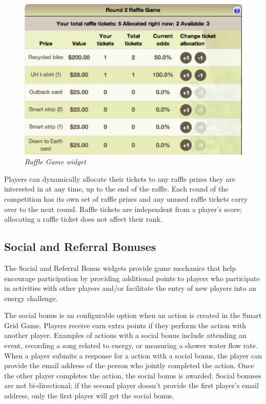 \begin{figure}[th]
  \center
  \includegraphics[width=0.95\columnwidth]{raffle-small.eps}
  \caption{\em \small Raffle Game widget}
  \label{fig:RaffleGame}
\end{figure}

Players can dynamically allocate their tickets to any raffle prizes they are interested in at any time, up to the end of the raffle. Each round of the competition has its own set of raffle prizes and any unused raffle tickets carry over to the next round. Raffle tickets are independent from a player's score; allocating a raffle ticket does not affect their rank. 

\subsection{Social and Referral Bonuses}

The Social and Referral Bonus widgets provide game mechanics that help encourage participation by providing additional points to players who participate in activities with other players and/or facilitate the entry of new players into an energy challenge.

The social bonus is an configurable option when an action is created in the Smart Grid Game. Players receive earn extra points if they perform the action with another player. Examples of actions with a social bonus include attending an event, recording a song related to energy, or measuring a shower water flow rate. When a player submits a response for a action with a social bonus, the player can provide the email address of the person who jointly completed the action. Once the other player completes the action, the social bonus is awarded. Social bonuses are not bi-directional; if the second player doesn't provide the first player's email address, only the first player will get the social bonus.

